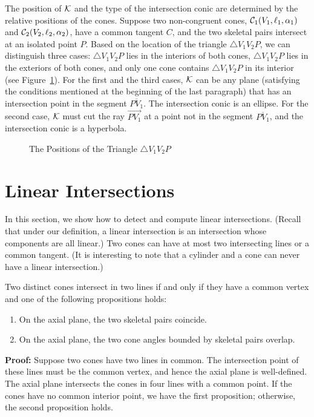      The position of ${\cal K}$ and the type of the intersection conic are
determined by the relative positions of the cones. Suppose two 
non-congruent cones, ${\cal C}_1(V_1,\ell_1,\alpha_1)$ and
${\cal C}_2(V_2,\ell_2,\alpha_2)$, have a common tangent $C$, and
the two skeletal pairs intersect at an isolated point $P$.
Based on the location of the triangle $\bigtriangleup V_1V_2P$, we can
distinguish three cases: $\bigtriangleup V_1V_2P$ lies in the interiors of both
cones, $\bigtriangleup V_1V_2P$ lies in the exteriors of both cones, and
only one cone contains $\bigtriangleup V_1V_2P$ in its interior
(see Figure~\ref{fig:three-case}).  For the first and the third cases, 
${\cal K}$ can be any plane (satisfying the conditions mentioned at the 
beginning of the last paragraph) that has an intersection point in the segment
$\overline{PV_1}$.  The intersection conic is an ellipse.  For the second 
case, ${\cal K}$ must cut the ray $\stackrel{\longrightarrow}{PV_1}$ at a point
not in the segment $\overline{PV_1}$, and the intersection conic is a 
hyperbola.
\begin{figure}
\vspace{4cm}
\caption{The Positions of the Triangle $\bigtriangleup V_1V_2P$}
\label{fig:three-case}
\end{figure}


\section{Linear Intersections}
\label{section:linear}

     In this section, we show how to detect and compute linear intersections.
(Recall that under our definition, a linear intersection is an intersection 
whose components are all linear.)  Two cones can have at most two intersecting
lines or a common tangent. (It is interesting to note that a cylinder and a
cone can never have a linear intersection.)

\begin{lemma}
\label{lemma:cone-cone-linear}
     Two distinct cones intersect in two lines if and only if they have a
common vertex and one of the following propositions holds:
\begin{enumerate}
     \item On the axial plane, the two skeletal pairs coincide.
     \item On the axial plane, the two cone angles bounded by skeletal pairs
          overlap.
\end{enumerate}
\end{lemma}
{\bf Proof:} Suppose two cones have two lines in common.
The intersection point of these lines must be the common vertex, and hence
the axial plane is well-defined.  The axial plane intersects the cones in four
lines with a common point.  If the cones have no common interior point, we have
the first proposition; otherwise, the second proposition holds.

